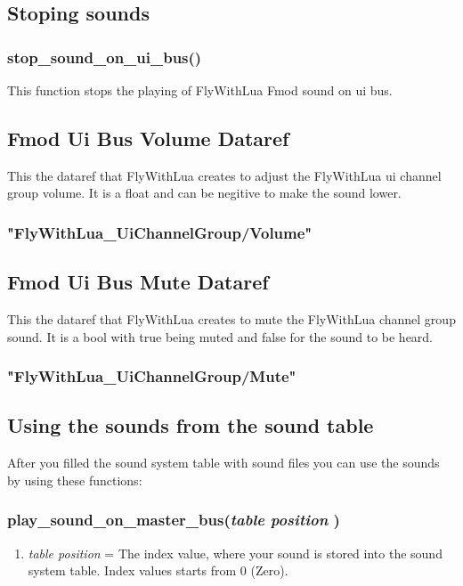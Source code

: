 \documentclass[11pt,parskip=half,a4paper]{scrartcl}
\begin{document}
\subsection{Stoping sounds}
\subsubsection{ stop\_sound\_on\_ui\_bus()}
This function stops the playing of FlyWithLua Fmod sound on ui bus.


\subsection{Fmod Ui Bus Volume Dataref}
This the dataref that FlyWithLua creates to adjust the FlyWithLua ui channel group volume. It is a float and can be negitive to make the sound lower.

\subsubsection{"FlyWithLua\_UiChannelGroup/Volume"}

\subsection{Fmod Ui Bus Mute Dataref}
This the dataref that FlyWithLua creates to mute the FlyWithLua channel group sound. It is a bool with true being muted and false for the sound to be heard.

\subsubsection{"FlyWithLua\_UiChannelGroup/Mute"}


\newpage
\subsection{Using the sounds from the sound table}

After you filled the sound system table with sound files you can use the sounds by using these functions:


\subsubsection{ play\_sound\_on\_master\_bus(\emph{table position} )}

\begin{enumerate}
	\item \emph{table position} = The index value, where your sound is stored into the sound system table. Index values starts from 0 (Zero).
\end{enumerate}
\end{document}
